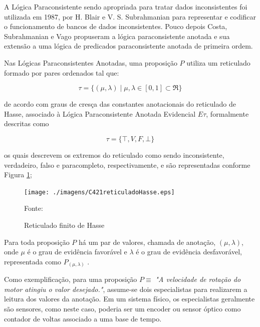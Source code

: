 A Lógica Paraconsistente sendo apropriada para tratar dados inconsistentes foi utilizada em 1987, 
por H. Blair e V. S. Subrahmanian para representar e codificar o funcionamento de bancos de dados inconsistentes. 
\cite{Abe1992} 
Pouco depois Costa, Subrahmanian e Vago propuseram a lógica paraconsistente anotada e sua extensão a uma lógica de predicados paraconsistente anotada de primeira ordem. 

Nas Lógicas Paraconsistentes Anotadas, uma proposição $P$ utiliza um reticulado formado por pares ordenados tal que: 

\begin{center}
\begin{equation}
\tau = \{ ( \mu , \lambda ) \mid \mu ,\lambda \in [0,1] \subset \Re \}
\end{equation}
\end{center}

de acordo com graus de cresça das constantes anotacionais do reticulado de Hasse, 
associado à Lógica Paraconsistente Anotada Evidencial $E\tau$, 
formalmente descritas como 

\begin{center}
\begin{equation}
  \tau = \{ \top , V, F, \bot \}
\end{equation}
\end{center}

os quais descrevem os extremos do reticulado como sendo 
inconsistente,%
verdadeiro, %
falso e %
paracompleto,%
respectivamente, e são representadas conforme Figura \ref{fig:reticuladoHasse}; 

\begin{figure}[!htb]
\caption{Reticulado finito de Hasse}
\center\texttt{[image: ./imagens/C421reticuladoHasse.eps]}
\label{fig:reticuladoHasse}

{\small Fonte: \cite{JoaoInacio} }
\end{figure}

Para toda proposição $P$ há um par de valores, chamada de anotação, $(\mu , \lambda )$, onde $\mu$ é o grau de evidência favorável e $\lambda $ é o grau de evidência desfavorável, representada como  $P_{( \mu , \lambda )}$ \cite{Abe2014} .

Como exemplificação, para uma proposição $P \equiv$ \emph{"A velocidade de rotação do motor atingiu o valor desejado."}, assume-se dois especialistas para realizarem a leitura dos valores da anotação. Em um sistema físico, os especialistas geralmente são sensores, como neste caso, poderia ser um encoder ou sensor óptico como contador de voltas associado a uma base de tempo.

